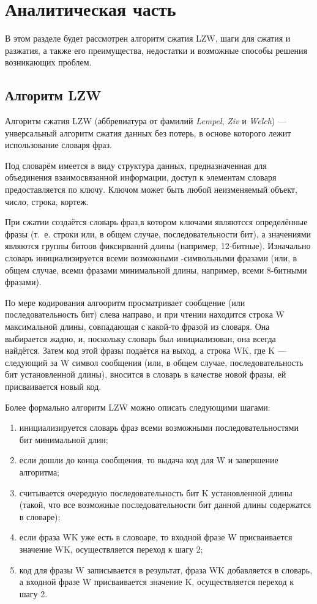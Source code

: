 \chapter{Аналитическая часть}
В этом разделе будет рассмотрен алгоритм сжатия LZW, шаги для сжатия и разжатия, а также его преимущества, недостатки и возможные способы решения возникающих проблем.


\section{Алгоритм LZW}

Алгоритм сжатия LZW (аббревиатура от фамилий \textit{Lempel}, \textit{Ziv} и \textit{Welch}) --- унверсальный алгоритм сжатия данных без потерь, в основе которого лежит использование словаря фраз.

Под словарём имеется в виду структура данных, предназначенная для объединения взаимосвязанной информации, доступ к элементам словаря предоставляется по ключу. Ключом может быть любой неизменяемый объект, число, строка, кортеж. 

При сжатии создаётся словарь фраз,в котором ключами являютсся определённые фразы (т.~е. строки или, в общем случае, последовательности бит), а значениями являются группы битоов фиксирваннй длины (например, 12-битные). Изначально словарь инициализируется всеми возможными -символьными фразами (или, в общем случае, всеми фразами минимальной длины, например, всеми 8-битными фразами). 

По мере кодирования алгооритм просматривает сообщение (или последовательность бит) слева направо, и при чтении находится строка W максимальной длины, совпадающая с какой-то фразой из словаря. Она выбирается жадно, и, поскольку словарь был инициализован, она всегда найдётся. Затем код этой фразы подаётся на выход, а строка WK, где K --- следующий за W символ сообщения (или, в общем случае, последовательность бит установленной длины), вносится в словарь в качестве новой фразы, ей присваивается новый код.

Более формально алгоритм LZW можно описать следующими шагами:
\begin{enumerate}[label=\arabic*)]
	\item инициализируется словарь фраз всеми возможными последовательностями бит минимальной длин;
    \item если дошли до конца сообщения, то выдача код для W и завершение алгоритма;
	\item считывается очередную последовательность бит K установленной длины (такой, что все возможные последовательности бит данной длины содержатся в словаре);
	\item если фраза WK уже есть в словоаре, то входной фразе W присваивается значение WK, осуществляется переход к шагу 2;
	\item код для фразы W записывается в результат, фраза WK добавляется в словарь, а входной фразе W присваивается значение K, осуществляется переход к шагу 2.
\end{enumerate}

